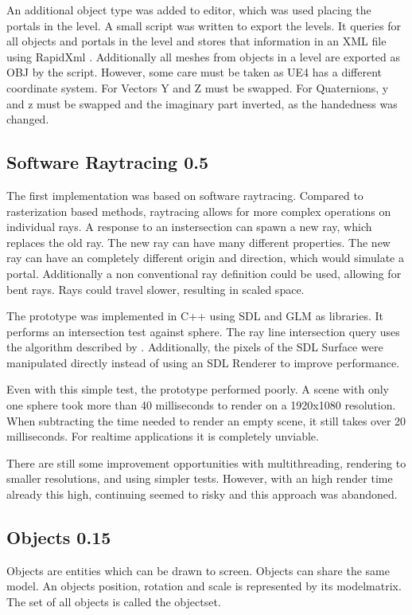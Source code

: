 An additional object type was added to editor, which was used placing the portals in the level. A small script was written to export the levels. It queries for all objects and portals in the level and stores that information in an XML file using RapidXml \cite{rapidxml}. Additionally all meshes from objects in a level are exported as OBJ by the script. However, some care must be taken as UE4 has a different coordinate system. For Vectors Y and Z must be swapped. For Quaternions, y and z must be swapped and the imaginary part inverted, as the handedness was changed.


\subsection{Software Raytracing 0.5}
The first implementation was based on software raytracing. Compared to rasterization based methods, raytracing allows for more complex operations on individual rays. A response to an instersection can spawn a new ray, which replaces the old ray. The new ray can have many different properties. The new ray can have an completely different origin and direction, which would simulate a portal. Additionally a non conventional ray definition could be used, allowing for bent rays. Rays could travel slower, resulting in scaled space.

The prototype was implemented in C++ using SDL \cite{sdl} and GLM \cite{glm} as libraries. It performs an intersection test against sphere. The ray line intersection query uses the algorithm described by \textcite{eberly:2006:3d}. Additionally, the pixels of the SDL Surface were manipulated directly instead of using an SDL Renderer to improve performance.

Even with this simple test, the prototype performed poorly. A scene with only one sphere took more than 40 milliseconds to render on a 1920x1080 resolution. When subtracting the time needed to render an empty scene, it still takes over 20 milliseconds. For realtime applications it is completely unviable.

There are still some improvement opportunities with multithreading, rendering to smaller resolutions, and using simpler tests. However, with an high render time already this high, continuing seemed to risky and this approach was abandoned.






\subsection{Objects 0.15}
Objects are entities which can be drawn to screen. Objects can share the same model. An objects position, rotation and scale is represented by its \gls{modelmatrix}. The set of all objects is called the \gls{objectset}.

